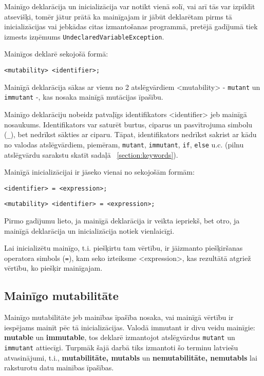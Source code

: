 \documentclass[12pt,a4paper]{report}
\begin{document}
Mainīgo deklarācija un inicializācija var notikt vienā solī, vai arī tās var izpildīt atsevišķi, tomēr jātur prātā ka mainīgajam ir jābūt deklarētam pirms tā inicializācijas vai jebkādas citas izmantošanas programmā, pretējā gadījumā tiek izmests izņēmums \texttt{UndeclaredVariableException}.

Mainīgos deklarē sekojošā formā:
\begin{verbatim}
<mutability> <identifier>;
\end{verbatim}


Mainīgā deklarācija sākas ar vienu no 2 atslēgvārdiem <mutability> - \texttt{mutant} un \texttt{immutant} -, kas nosaka mainīgā mutācijas īpašību. 

Mainīgo deklarāciju nobeidz patvaļīgs identifikators <identifier> jeb mainīgā nosaukums. Identifikators var saturēt burtus, ciparus un pasvītrojuma simbolu (\texttt{\_}), bet nedrīkst sākties ar ciparu. Tāpat, identifikators nedrīkst sakrist ar kādu no valodas atslēgvārdiem, piemēram, \texttt{mutant}, \texttt{immutant}, \texttt{if}, \texttt{else} u.c. (pilnu atslēgvārdu sarakstu skatīt sadaļā ~\ref{section:keywords}).

Mainīgā inicializācijai ir jāseko vienai no sekojošām formām:

\begin{verbatim}
<identifier> = <expression>;
\end{verbatim}  

\begin{verbatim}
<mutability> <identifier> = <expression>;
\end{verbatim}  

Pirmo gadījumu lieto, ja mainīgā deklarācija ir veikta iepriekš, bet otro, ja mainīgā deklarācija un inicializācija notiek vienlaicīgi.

Lai inicializētu mainīgo, t.i. piešķirtu tam vērtību, ir jāizmanto piešķiršanas operatora simbols (\texttt{=}), kam seko izteiksme <expression>, kas rezultātā atgriež vērtību, ko piešķir mainīgajam.

\subsection{Mainīgo mutabilitāte}
\label{section:var-mutability}

Mainīgo mutabilitāte jeb mainības īpašība nosaka, vai mainīgā vērtību ir iespējams mainīt pēc tā inicializācijas. 
Valodā immutant ir divu veidu mainīgie: \textbf{mutable} un \textbf{immutable}, tos deklarē izmantojot atslēgvārdus \texttt{mutant} un \texttt{immutant} attiecīgi. Turpmāk šajā darbā tiks izmantoti šo terminu latviešu atvasinājumi, t.i., \textbf{mutabilitāte, mutabls} un \textbf{nemutabilitāte, nemutabls} lai raksturotu datu mainības īpašības.
\end{document}
